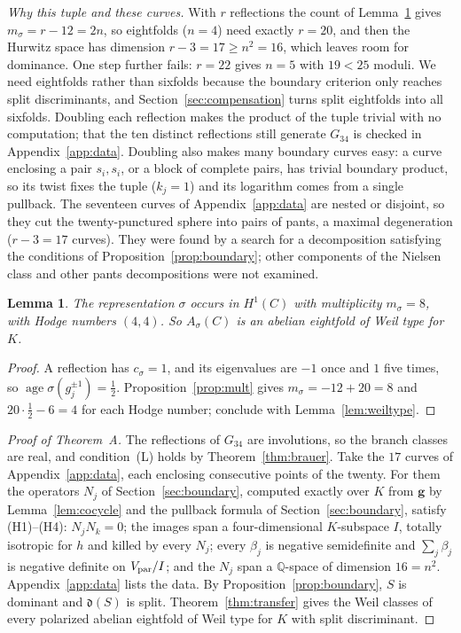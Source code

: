\documentclass[11pt]{amsart}
\newtheorem{lemma}[theorem]{Lemma}
\theoremstyle{definition}
\theoremstyle{remark}
\newcommand{\Q}{\mathbb Q}
\newcommand{\age}{\operatorname{age}}
\newcommand{\Vp}{V_{\rm par}}
\newcommand{\fd}{\mathfrak d}
\begin{document}
\emph{Why this tuple and these curves.} With $r$ reflections the count of Lemma~\ref{lem:g34mult} gives $m_\sigma=r-12=2n$, so eightfolds ($n=4$) need exactly $r=20$, and then the Hurwitz space has dimension $r-3=17\ge n^2=16$, which leaves room for dominance. One step further fails: $r=22$ gives $n=5$ with $19<25$ moduli. We need eightfolds rather than sixfolds because the boundary criterion only reaches split discriminants, and Section~\ref{sec:compensation} turns split eightfolds into all sixfolds. Doubling each reflection makes the product of the tuple trivial with no computation; that the ten distinct reflections still generate $G_{34}$ is checked in Appendix~\ref{app:data}. Doubling also makes many boundary curves easy: a curve enclosing a pair $s_i,s_i$, or a block of complete pairs, has trivial boundary product, so its twist fixes the tuple ($k_j=1$) and its logarithm comes from a single pullback. The seventeen curves of Appendix~\ref{app:data} are nested or disjoint, so they cut the twenty-punctured sphere into pairs of pants, a maximal degeneration ($r-3=17$ curves). They were found by a search for a decomposition satisfying the conditions of Proposition~\ref{prop:boundary}; other components of the Nielsen class and other pants decompositions were not examined.

\begin{lemma}\label{lem:g34mult}
The representation $\sigma$ occurs in $H^1(C)$ with multiplicity $m_\sigma=8$, with Hodge numbers $(4,4)$. So $A_\sigma(C)$ is an abelian eightfold of Weil type for $K$.
\end{lemma}

\begin{proof}
A reflection has $c_\sigma=1$, and its eigenvalues are $-1$ once and $1$ five times, so $\age\sigma(g_j^{\pm1})=\tfrac12$. Proposition~\ref{prop:mult} gives $m_\sigma=-12+20=8$ and $20\cdot\tfrac12-6=4$ for each Hodge number; conclude with Lemma~\ref{lem:weiltype}.
\end{proof}

\begin{proof}[Proof of Theorem~A]
The reflections of $G_{34}$ are involutions, so the branch classes are real, and condition~(L) holds by Theorem~\ref{thm:brauer}. Take the $17$ curves of Appendix~\ref{app:data}, each enclosing consecutive points of the twenty. For them the operators $N_j$ of Section~\ref{sec:boundary}, computed exactly over $K$ from $\mathbf g$ by Lemma~\ref{lem:cocycle} and the pullback formula of Section~\ref{sec:boundary}, satisfy (H1)--(H4): $N_jN_k=0$; the images span a four-dimensional $K$-subspace $I$, totally isotropic for $h$ and killed by every $N_j$; every $\beta_j$ is negative semidefinite and $\sum_j\beta_j$ is negative definite on $\Vp/I$; and the $N_j$ span a $\Q$-space of dimension $16=n^2$. Appendix~\ref{app:data} lists the data. By Proposition~\ref{prop:boundary}, $S$ is dominant and $\fd(S)$ is split. Theorem~\ref{thm:transfer} gives the Weil classes of every polarized abelian eightfold of Weil type for $K$ with split discriminant.
\end{proof}
\end{document}
